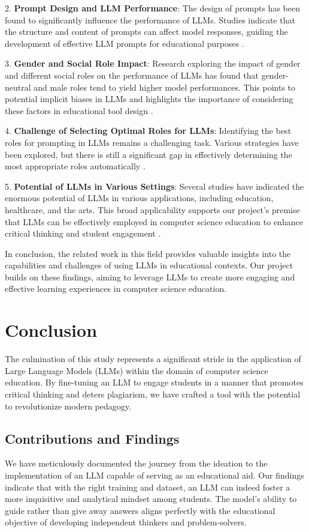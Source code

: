 \documentclass[]{article}
\begin{document}
2. \textbf{Prompt Design and LLM Performance}: The design of prompts has been found to significantly influence the performance of LLMs. Studies indicate that the structure and content of prompts can affect model responses, guiding the development of effective LLM prompts for educational purposes \cite{Mingqian}.

3. \textbf{Gender and Social Role Impact}: Research exploring the impact of gender and different social roles on the performance of LLMs has found that gender-neutral and male roles tend to yield higher model performances. This points to potential implicit biases in LLMs and highlights the importance of considering these factors in educational tool design \cite{Mingqian}.

4. \textbf{Challenge of Selecting Optimal Roles for LLMs}: Identifying the best roles for prompting in LLMs remains a challenging task. Various strategies have been explored, but there is still a significant gap in effectively determining the most appropriate roles automatically \cite{Mingqian}.

5. \textbf{Potential of LLMs in Various Settings}: Several studies have indicated the enormous potential of LLMs in various applications, including education, healthcare, and the arts. This broad applicability supports our project's premise that LLMs can be effectively employed in computer science education to enhance critical thinking and student engagement \cite{Mingqian}.

In conclusion, the related work in this field provides valuable insights into the capabilities and challenges of using LLMs in educational contexts. Our project builds on these findings, aiming to leverage LLMs to create more engaging and effective learning experiences in computer science education.

\section{Conclusion}

The culmination of this study represents a significant stride in the application of Large Language Models (LLMs) within the domain of computer science education. By fine-tuning an LLM to engage students in a manner that promotes critical thinking and deters plagiarism, we have crafted a tool with the potential to revolutionize modern pedagogy.

\subsection{Contributions and Findings}
We have meticulously documented the journey from the ideation to the implementation of an LLM capable of serving as an educational aid. Our findings indicate that with the right training and dataset, an LLM can indeed foster a more inquisitive and analytical mindset among students. The model's ability to guide rather than give away answers aligns perfectly with the educational objective of developing independent thinkers and problem-solvers.
\end{document}
